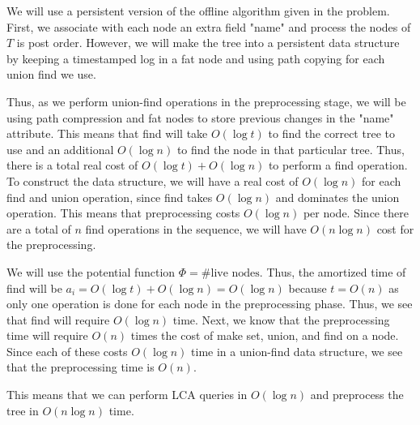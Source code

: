 \documentclass[psamsfonts]{amsart}
\newenvironment{sol}{{\bfseries Solution:}}{\qedsymbol}
\begin{document}
\begin{sol}
We will use a persistent version of the offline algorithm given in the problem. First, we associate with each node an extra field "name" and process the nodes of $T$ is post order. However, we will make the tree into a persistent data structure by keeping a timestamped log in a fat node and using path copying for each union find we use. 

Thus, as we perform union-find operations in the preprocessing stage, we will be using path compression and fat nodes to store previous changes in the "name" attribute. This means that find will take $O(\log t)$ to find the correct tree to use and an additional $O(\log n)$ to find the node in that particular tree. Thus, there is a total real cost of $O(\log t) + O(\log n)$ to perform a find operation. To construct the data structure, we will have a real cost of $O(\log n)$ for each find and union operation, since find takes $O(\log n)$ and dominates the union operation. This means that preprocessing costs $O(\log n)$ per node. Since there are a total of $n$ find operations in the sequence, we will have $O(n \log n)$ cost for the preprocessing. 

We will use the potential function $\Phi = \text{\# live nodes}$. Thus, the amortized time of find will be $a_i = O(\log t) + O(\log n) = O(\log n)$ because $t = O(n)$ as only one operation is done for each node in the preprocessing phase. Thus, we see that find will require $O(\log n)$ time. Next, we know that the preprocessing time will require $O(n)$ times the cost of make set, union, and find on a node. Since each of these costs $O(\log n)$ time in a union-find data structure, we see that the preprocessing time is $O(n)$.

This means that we can perform LCA queries in $O(\log n)$ and preprocess the tree in $O(n \log n)$ time.
\end{sol}
\end{document}
